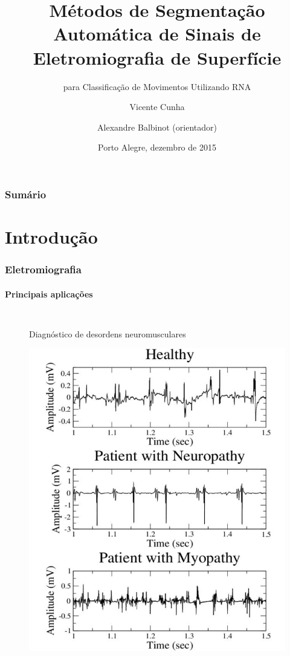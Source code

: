 \documentclass{beamer}
\title[Métodos de Segmentação Automática de Sinais de sEMG]{Métodos de Segmentação Automática de Sinais de Eletromiografia de Superfície}
\subtitle{para Classificação de Movimentos Utilizando RNA}
\author[Cunha] {Vicente Cunha \\ \and Alexandre Balbinot (orientador)}
\institute[UFRGS]{Universidade Federal do Rio Grande do Sul}
\date[dezembro de 2015]{Porto Alegre, dezembro de 2015}
\begin{document}
	
	\frame{\titlepage}
	
	\begin{frame}
		\frametitle{Sumário}
		\tableofcontents[]
	\end{frame}
	
	\section[Introdução]{Introdução}
	
	\begin{frame}
		\frametitle{Eletromiografia}
		\framesubtitle{Principais aplicações}
		\begin{columns}[c]
			\column{.5\textwidth}
				\begin{figure}
					Diagnóstico de desordens neuromusculares
					\begin{center}
						\includegraphics[width=\textwidth]{./img/disorders.png}
					\end{center}
				\end{figure}
				

\end{columns}
\end{frame}
\end{document}
